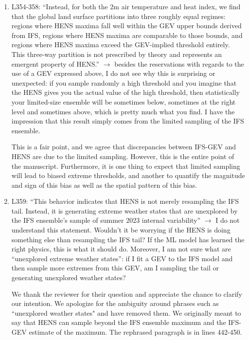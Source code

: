 \documentclass[11pt]{article}
\newcommand{\newTxt}{\textcolor{cadmiumgreen}}
\begin{document}
\begin{enumerate}
    \item L354-358: “Instead, for both the 2m air temperature and heat index, we find that the global land surface partitions into three roughly equal regimes: regions where HENS maxima fall well within the GEV upper bounds derived from IFS, regions where HENS maxima are comparable to those bounds, and regions where HENS maxima exceed the GEV-implied threshold entirely. This three-way partition is not prescribed by theory and represents an emergent property of HENS.” $\rightarrow$ besides the reservations with regards to the use of a GEV expressed above, I do not see why this is surprising or unexpected: if you sample randomly a high threshold and you imagine that the HENS gives you the actual value of the high threshold, then statistically your limited-size ensemble will be sometimes below, sometimes at the right level and sometimes above, which is pretty much what you find. I have the impression that this result simply comes from the limited sampling of the IFS ensemble.

    \newTxt{This is a fair point, and we agree that discrepancies between IFS-GEV and HENS are due to the limited sampling. However, this is the entire point of the manuscript. Furthermore, it is one thing to expect that limited sampling will lead to biased extreme thresholds, and another to quantify the magnitude and sign of this bias as well as the spatial pattern of this bias.}
    
    \item L359: “This behavior indicates that HENS is not merely resampling the IFS tail. Instead, it is generating extreme weather states that are unexplored by the IFS ensemble’s sample of summer 2023 internal variability” $\rightarrow$ I do not understand this statement. Wouldn’t it be worrying if the HENS is doing something else than resampling the IFS tail? If the ML model has learned the right physics, this is what it should do. Moreover, I am not sure what are “unexplored extreme weather states”: if I fit a GEV to the IFS model and then sample more extremes from this GEV, am I sampling the tail or generating unexplored weather states?

   \newTxt{We thank the reviewer for their question and appreciate the chance to clarify our intention.  We apologize for the ambiguity around phrases such as ``unexplored weather states" and have removed them.  We originally meant to say that HENS can sample beyond the IFS ensemble maximum and the IFS-GEV estimate of the maximum.  The rephrased paragraph is in lines 442-450.}
   

\end{enumerate}
\end{document}

